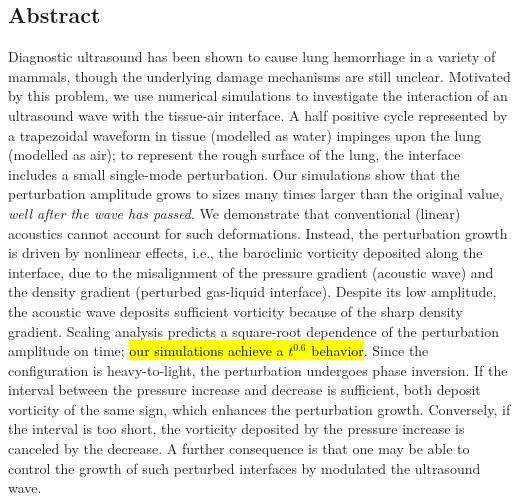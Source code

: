 \begin{center}
  \begin{minipage}{0.8\textwidth}
    \subsection*{Abstract}
    Diagnostic ultrasound has been shown to cause lung hemorrhage in a
    variety of mammals, though the underlying damage mechanisms are still
    unclear. Motivated by this problem, we use numerical simulations to
    investigate the interaction of an ultrasound wave with the tissue-air
    interface. A half positive cycle represented by a trapezoidal waveform
    in tissue (modelled as water) impinges upon the lung (modelled as
    air); to represent the rough surface of the lung, the interface
    includes a small single-mode perturbation. Our simulations show that
    the perturbation amplitude grows to sizes many times larger than the
    original value, \emph{well after the wave has passed}. We demonstrate
    that conventional (linear) acoustics cannot account for such
    deformations. Instead, the perturbation growth is driven by nonlinear
    effects, i.e., the baroclinic vorticity deposited along the interface,
    due to the misalignment of the pressure gradient (acoustic wave) and
    the density gradient (perturbed gas-liquid interface). Despite its low
    amplitude, the acoustic wave deposits sufficient vorticity because of
    the sharp density gradient. Scaling analysis predicts a square-root
    dependence of the perturbation amplitude on time; \hl{our simulations
    achieve a $t^{0.6}$ behavior}. Since the configuration is
    heavy-to-light, the perturbation undergoes phase inversion. If the
    interval between the pressure increase and decrease is sufficient,
    both deposit vorticity of the same sign, which enhances the
    perturbation growth. Conversely, if the interval is too short, the
    vorticity deposited by the pressure increase is canceled by the
    decrease. A further consequence is that one may be able to control the
    growth of such perturbed interfaces by modulated the ultrasound wave.
  \end{minipage}
\end{center}


